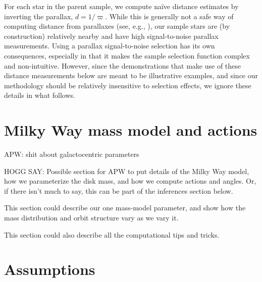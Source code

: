 \documentclass[modern]{aastex63}
\begin{document}
For each star in the parent sample, we compute na\"ive distance estimates by
inverting the parallax, $d = 1/\varpi$.
While this is generally not a safe way of computing distance from parallaxes
(see, e.g., \citealt{Bailer-Jones:2015}), our sample stars are (by construction)
relatively nearby and have high signal-to-noise parallax measurements.
Using a parallax signal-to-noise selection has its own consequences, especially
in that it makes the sample selection function complex and non-intuitive.
However, since the demonstrations that make use of these distance measurements
below are meant to be illustrative examples, and since our methodology should be
relatively insensitive to selection effects, we ignore these details in what
follows.


\section{Milky Way mass model and actions}

APW: shit about galactocentric parameters

HOGG SAY: Possible section for APW to put details of the Milky Way model,
how we parameterize the disk mass, and how we compute actions and angles.
Or, if there isn't much to say, this can be part of the inferences section
below.

This section could describe our one mass-model parameter, and show how
the mass distribution and orbit structure vary as we vary it.

This section could also describe all the computational tips and tricks.

\section{Assumptions}
\end{document}
